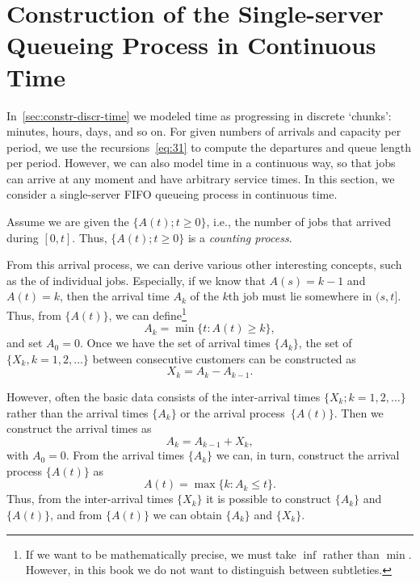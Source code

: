 \section
[Single-server Queueing Process in Continuous Time]
{Construction of the Single-server Queueing Process in Continuous Time}
\label{sec:constr-gg1-queu}



In~\cref{sec:constr-discr-time} we modeled time as progressing in discrete `chunks': minutes, hours, days, and so on.
For given numbers of arrivals and capacity per period, we use the recursions~\cref{eq:31} to compute the departures and queue length per period.
However, we can also model time in a continuous way, so that jobs can arrive at any moment and have arbitrary service times. 
In this section, we consider a single-server FIFO queueing process in continuous time.

Assume we are given the  $\{A(t); t\geq 0\}$, i.e., the number of jobs that arrived during $[0,t]$.
Thus, $\{A(t); t\geq 0\}$ is a \emph{counting process}.

From this arrival process, we can derive various other interesting concepts, such as the  of individual jobs.
Especially, if we know that $A(s) = k-1$ and $A(t) = k$, then the arrival time $A_k$ of the $k$th job must lie somewhere in $(s,t]$.
Thus, from $\{A(t)\}$, we can define\footnote{If we want to be mathematically precise, we must take $\inf$ rather than $\min$.
 However, in this book we do not want to distinguish between subtleties.}
\begin{equation}\label{eq:27}
 A_k = \min\{t: A(t) \geq k\},
\end{equation}
and set $A_0 = 0$.
Once we have the set of arrival times $\{A_k\}$, the set of  $\{X_k, k=1, 2, \ldots\}$ between consecutive customers can be constructed as
\begin{equation}
 X_k = A_k - A_{k-1}.
\end{equation}

However, often the basic data consists of the inter-arrival times $\{X_k; k=1,2,\ldots\}$ rather than the arrival times $\{A_k\}$ or the arrival process~$\{A(t)\}$.
Then we construct the arrival times as
\begin{equation*}
 A_k = A_{k-1} + X_k,
\end{equation*}
with $A_0 = 0$.
From the arrival times $\{A_k\}$ we can, in turn, construct the arrival process $\{A(t)\}$ as
\begin{equation} \label{eq:2}
 A(t) = \max\{k: A_k \leq t\}.
\end{equation}
Thus, from the inter-arrival times $\{X_k\}$ it is possible to construct $\{A_k\}$ and $\{A(t)\}$, and from $\{A(t)\}$ we can obtain $\{A_k\}$ and $\{X_k\}$.


